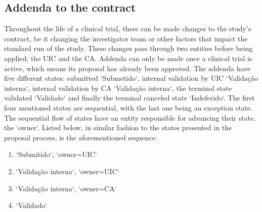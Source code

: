 \subsection{Addenda to the contract}
Throughout the life of a clinical trial, there can be made changes to the study's contract, be it changing the investigator team or other factors that impact the standard run of the study. These changes pass through two entities before being applied; the UIC and the CA.  
Addenda can only be made once a clinical trial is active, which means its proposal has already been approved.  
The addenda have five different states: submitted `Submetido`, internal validation by UIC `Validação interna`, internal validation by CA `Validação interna`, the terminal state validated `Validado` and finally the terminal canceled state `Indeferido`.  
The first four mentioned states are sequential, with the last one being an exception state. The sequential flow of states have an entity responsible for advancing their state, the `owner`. Listed below, in similar fashion to the states presented in the proposal process, is the aforementioned sequence:
\begin{enumerate}
    \item `Submitido`, `owner=UIC`
    \item `Validação interna`, `owner=UIC` 
    \item `Validação interna`, `owner=CA`
    \item `Validado`
\end{enumerate}


